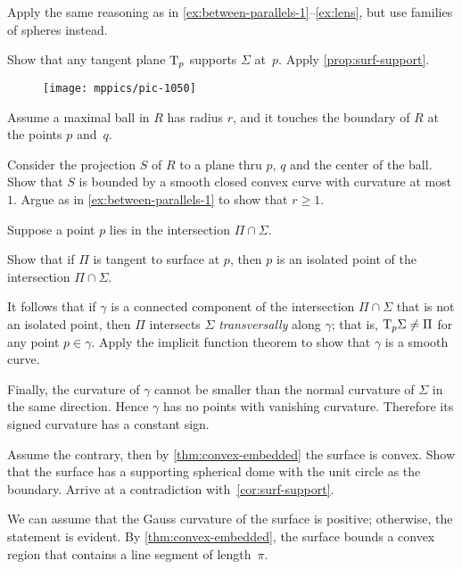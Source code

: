 \begin{multicols}{2}
Apply the same reasoning as in \ref{ex:between-parallels-1}--\ref{ex:lens}, but use families of spheres instead.

Show that any tangent plane $\mathrm{T}_p$ supports $\Sigma$ at~$p$.
Apply \ref{prop:surf-support}.

{

\begin{wrapfigure}{r}{16 mm}
\vskip-0mm
\centering
\texttt{[image: mppics/pic-1050]}
\vskip-0mm
\end{wrapfigure}

Assume a maximal ball in $R$ has radius $r$, and it touches the boundary of $R$ at the points $p$ and~$q$.

Consider the projection $S$ of $R$ to a plane thru $p$, $q$ and the center of the ball.
Show that $S$ is bounded by a smooth closed convex curve with curvature at most $1$.
Argue as in \ref{ex:between-parallels-1} to
show that $r\ge 1$.

}

Suppose a point $p$ lies in the intersection $\Pi\cap\Sigma$.

Show that if $\Pi$ is tangent to surface at $p$,
then $p$ is an isolated point of the intersection $\Pi\cap\Sigma$.

It follows that if $\gamma$ is a connected component of the intersection $\Pi\cap\Sigma$ that is not an isolated point,
then $\Pi$ intersects $\Sigma$ \emph{transversally} along $\gamma$;
that is, $\mathrm{T}_p\Sigma\ne\Pi$ for any point $p \in \gamma$.
Apply the implicit function theorem to show that $\gamma$ is a smooth curve.

Finally, the curvature of $\gamma$ cannot be smaller than the normal curvature of $\Sigma$ in the same direction.
Hence $\gamma$ has no points with vanishing curvature.
Therefore its signed curvature has a constant sign.


Assume the contrary, then by \ref{thm:convex-embedded} the surface is convex.
Show that the surface has a supporting spherical dome with the unit circle as the boundary.
Arrive at a contradiction with~\ref{cor:surf-support}.

We can assume that the Gauss curvature of the surface is positive; otherwise, the statement is evident.
By \ref{thm:convex-embedded}, the surface bounds a convex region that contains a line segment of length~$\pi$.


\end{multicols}
